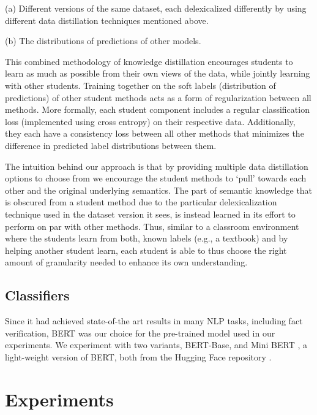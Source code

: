 {\flushleft (a)} Different versions of the same dataset, each delexicalized differently by using different data distillation techniques mentioned above.

{\flushleft (b)} The distributions of predictions of other models.

This combined methodology of knowledge distillation encourages students to learn as much as possible from their own views of the data, while jointly learning with other students. Training together on the soft labels (distribution of predictions) of other student methods  acts as a form of regularization between all methods.
More formally, each student component includes a regular classification loss (implemented using cross entropy) on their respective data. Additionally, they each have a consistency loss between all other methods that minimizes the difference in predicted label distributions between them.

The intuition behind our approach is that by providing multiple data distillation options to choose from we encourage the student methods to `pull' towards each other and the original underlying semantics. The part of semantic knowledge that is obscured from a student method due to the particular delexicalization technique used in the dataset version it sees, is instead learned in its effort to perform on par with other methods.
Thus, similar to a classroom environment where the students learn from both, known labels (e.g., a textbook) and by helping another student learn, each student is able to thus choose the right amount of granularity needed to enhance its own understanding.
\vspace*{-1mm}
\subsection{Classifiers}

Since it had achieved state-of-the art results in many NLP tasks, including fact verification, BERT \citep{devlin-etal-2019-bert} 
was our  choice for the pre-trained model used in our experiments. We experiment with two variants, BERT-Base, and Mini BERT \cite {turc2019well}, a light-weight version of BERT, both from the Hugging Face repository \citep{wolf2019huggingface}. 

\section{Experiments}


